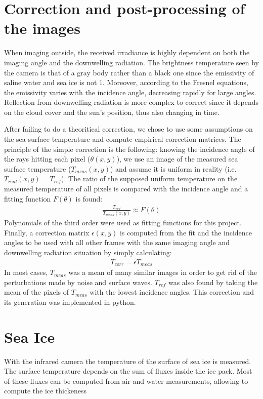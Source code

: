 \documentclass[a4paper,12pt]{article}
\begin{document}
\section{Correction and post-processing of the images}
When imaging outside, the received irradiance is highly dependent on both the imaging angle and the downwelling radiation. The brightness temperature seen by the camera is that of a gray body rather than a black one since the emissivity of saline water and sea ice is not 1. Moreover, according to the Fresnel equations, the emissivity varies with the incidence angle, decreasing rapidly for large angles. Reflection from downwelling radiation is more complex to correct since it depends on the cloud cover and the sun's position, thus also changing in time. 


After failing to do a theoritical correction, we chose to use some assumptions on the sea surface temperature and compute empirical correction matrices. The principle of the simple correction is the following: knowing the incidence angle of the rays hitting each pixel ($\theta(x, y)$), we use an image of the measured sea surface temperature ($T_{meas}(x,y)$) and assume it is uniform in reality (i.e. $T_{real}(x,y) = T_{ref}$). The ratio of the supposed uniform temperature on the measured temperature of all pixels is compared with the incidence angle and a fitting function $F(\theta)$ is found: 
\begin{align}
\frac{T_{ref}}{T_{meas}(x, y)} \approx F\left(\theta\right)
\end{align}
Polynomials of the third order were used as fitting functions for this project. Finally, a correction matrix $\epsilon(x,y)$ is computed from the fit and the incidence angles to be used with all other frames with the same imaging angle and downwelling radiation situation by simply calculating:
\begin{align}
T_{corr} = \epsilon T_{meas}
\end{align}
In most cases, $T_{meas}$ was a mean of many similar images in order to get rid of the perturbations made by noise and surface waves. $T_{ref}$ was also found by taking the mean of the pixels of $T_{meas}$ with the lowest incidence angles. This correction and its generation was implemented in python.


\section{Sea Ice}
With the infrared camera the temperature of the surface of sea ice is measured. The surface temperature depends on the sum of fluxes inside the ice pack. Most of these fluxes can be computed from air and water measurements, allowing to compute the ice thickeness
\end{document}

